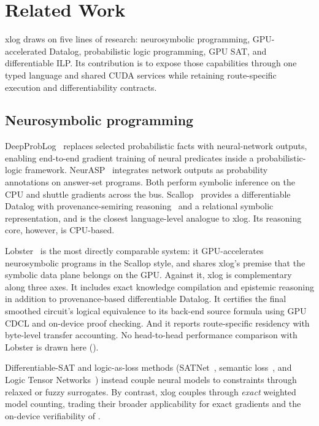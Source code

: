 \section{Related Work}\label{sec:related}

xlog draws on five lines of research: neurosymbolic programming, GPU-accelerated Datalog, probabilistic logic programming, GPU SAT, and differentiable ILP. Its contribution is to expose those capabilities through one typed language and shared CUDA services while retaining route-specific execution and differentiability contracts.

\subsection{Neurosymbolic programming}

DeepProbLog~\cite{deepproblog} replaces selected probabilistic facts with neural-network outputs, enabling end-to-end gradient training of neural predicates inside a probabilistic-logic framework. NeurASP~\cite{neurasp} integrates network outputs as probability annotations on answer-set programs. Both perform symbolic inference on the CPU and shuttle gradients across the bus. Scallop~\cite{scallop} provides a differentiable Datalog with provenance-semiring reasoning~\cite{green2007provenance} and a relational symbolic representation, and is the closest language-level analogue to xlog. Its reasoning core, however, is CPU-based.

Lobster~\cite{lobster} is the most directly comparable system: it GPU-accelerates neurosymbolic programs in the Scallop style, and shares xlog's premise that the symbolic data plane belongs on the GPU. Against it, xlog is complementary along three axes. It includes exact knowledge compilation and epistemic reasoning in addition to provenance-based differentiable Datalog. It certifies the final smoothed circuit's logical equivalence to its back-end source formula using GPU CDCL and on-device proof checking. And it reports route-specific residency with byte-level transfer accounting. No head-to-head performance comparison with Lobster is drawn here ().

Differentiable-SAT and logic-as-loss methods (SATNet~\cite{satnet}, semantic loss~\cite{semanticloss}, and Logic Tensor Networks~\cite{ltn}) instead couple neural models to constraints through relaxed or fuzzy surrogates. By contrast, xlog couples through \emph{exact} weighted model counting, trading their broader applicability for exact gradients and the on-device verifiability of .

